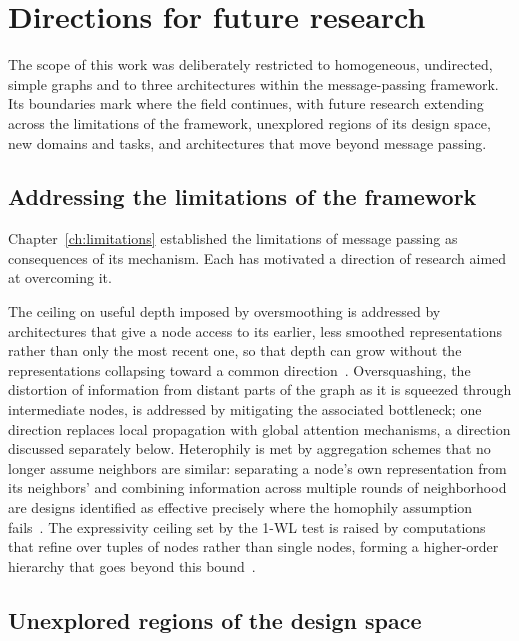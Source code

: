 \section{Directions for future research}
\label{sec:future-work}

The scope of this work was deliberately restricted to homogeneous, undirected,
simple graphs and to three architectures within the message-passing framework.
Its boundaries mark where the field continues, with future research extending
across the limitations of the framework, unexplored regions of its design space, 
new domains and tasks, and architectures that move beyond message passing.

\subsection{Addressing the limitations of the framework}
\label{sec:future-limitations}

Chapter~\ref{ch:limitations} established the limitations of message passing as
consequences of its mechanism. Each has motivated a direction of research
aimed at overcoming it.

The ceiling on useful depth imposed by oversmoothing is addressed by
architectures that give a node access to its earlier, less smoothed
representations rather than only the most recent one, so that depth can grow
without the representations collapsing toward a common
direction~\cite[-8pc]{xu2018}. Oversquashing, the distortion of information from distant 
parts of the graph as it is squeezed through intermediate nodes, is addressed 
by mitigating the associated bottleneck; one direction replaces local propagation 
with global attention mechanisms, a direction discussed separately below. 
Heterophily is met by aggregation schemes that no longer assume neighbors are similar:
separating a node's own representation from its neighbors' and combining
information across multiple rounds of neighborhood are designs identified as
effective precisely where the homophily assumption fails~\cite[-9.5pc]{zhu2020}. 
The expressivity ceiling set by the \mbox{1-WL} test is raised by computations that refine
over tuples of nodes rather than single nodes, forming a higher-order hierarchy
that goes beyond this bound~\cite[-5.5pc]{morris2019}.

\subsection{Unexplored regions of the design space}
\label{sec:future-design-space}

